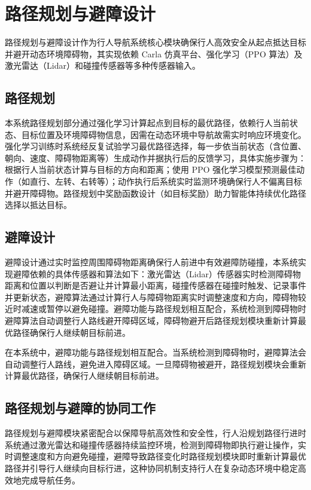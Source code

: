 \section{路径规划与避障设计}

路径规划与避障设计作为行人导航系统核心模块确保行人高效安全从起点抵达目标并避开动态环境障碍物，其实现依赖 Carla 仿真平台、强化学习（PPO 算法）及激光雷达（Lidar）和碰撞传感器等多种传感器输入。

\subsection{路径规划}

本系统路径规划部分通过强化学习计算起点到目标的最优路径，依赖行人当前状态、目标位置及环境障碍物信息，因需在动态环境中导航故需实时响应环境变化。强化学习训练时系统经反复试验学习最优路径选择，每一步依当前状态（含位置、朝向、速度、障碍物距离等）生成动作并据执行后的反馈学习，具体实施步骤为：根据行人当前状态计算与目标的方向和距离；使用 PPO 强化学习模型预测最佳动作（如直行、左转、右转等）；动作执行后系统实时监测环境确保行人不偏离目标并避开障碍物。路径规划中奖励函数设计（如目标奖励）助力智能体持续优化路径选择以抵达目标。

\subsection{避障设计}

避障设计通过实时监控周围障碍物距离确保行人前进中有效避障防碰撞，本系统实现避障依赖的具体传感器和算法如下：激光雷达（Lidar）传感器实时检测障碍物距离和位置以判断是否避让并计算最小距离，碰撞传感器在碰撞时触发、记录事件并更新状态，避障算法通过计算行人与障碍物距离实时调整速度和方向，障碍物较近时减速或暂停以避免碰撞。避障功能与路径规划相互配合，系统检测到障碍物时避障算法自动调整行人路线避开障碍区域，障碍物避开后路径规划模块重新计算最优路径确保行人继续朝目标前进。

在本系统中，避障功能与路径规划相互配合。当系统检测到障碍物时，避障算法会自动调整行人路线，避免进入障碍区域。一旦障碍物被避开，路径规划模块会重新计算最优路径，确保行人继续朝目标前进。

\subsection{路径规划与避障的协同工作}

路径规划与避障模块紧密配合以保障导航高效性和安全性，行人沿规划路径行进时系统通过激光雷达和碰撞传感器持续监控环境，检测到障碍物即执行避让操作，实时调整速度和方向避免碰撞，避障导致路径变化时路径规划模块即时重新计算最优路径并引导行人继续向目标行进，这种协同机制支持行人在复杂动态环境中稳定高效地完成导航任务。

